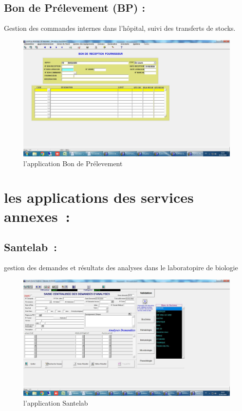 \documentclass[12pt]{rapportINPTCLOUD}
\begin{document}
\subsection{Bon de Prélevement (BP) :} Gestion des commandes internes dans l'hôpital, suivi des transferts de stocks.
\begin{figure}[H]
	\centering
	\includegraphics[width=1\linewidth]{img/g.jpg}
	\caption{l'application Bon de Prélevement}
	\label{fig:Bon de Prélevement}
\end{figure}
	\section{\textcolor{sectioncolor}{les applications des services annexes :}}

\subsection{Santelab :}   gestion des demandes et résultats des analyses dans le laboratopire de biologie 
\begin{figure}[H]
	\centering
	\includegraphics[width=1\linewidth]{img/h.jpg}
	\caption{l'application Santelab}
	\label{fig:Santelab}
\end{figure}
\newpage
\end{document}
